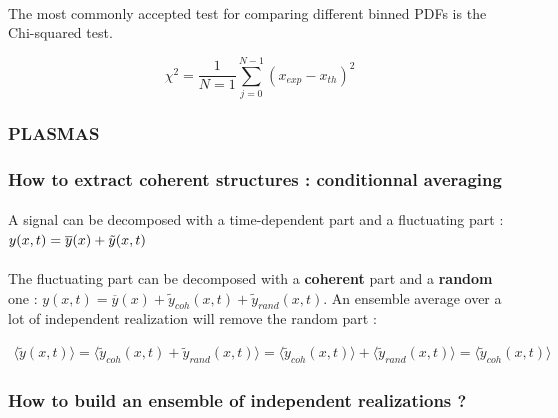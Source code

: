 \paragraph{}
The most commonly accepted test for comparing different binned PDFs is the Chi-squared test. 

\begin{equation}
    \chi^2 = \frac{1}{N=1}\sum_{j=0}^{N-1} (x_{exp} - x_{th})^2
\end{equation}

\subsubsection{PLASMAS}

\subsubsection{How to extract coherent structures : conditionnal averaging}

\paragraph{}
A signal can be decomposed with a time-dependent part and a fluctuating part : \(y(x,t) = \overline{y}(x) + \Tilde{y}(x,t)\)

\paragraph{}
The fluctuating part can be decomposed with a \textbf{coherent} part and a \textbf{random} one : \(y(x,t) = \overline{y} (x) + \tilde{y}_{coh} (x,t) + \tilde{y}_{rand}(x,t)\). An ensemble average over a lot of independent realization will remove the random part :

\begin{gather*}
    \langle \tilde{y}(x,t) \rangle = \langle \tilde{y}_{coh}(x,t) + \tilde{y}_{rand}(x,t) \rangle = \langle \tilde{y}_{coh}(x,t) \rangle + \langle \tilde{y}_{rand}(x,t) \rangle = \langle \tilde{y}_{coh}(x,t) \rangle 
\end{gather*}

\subsubsection{How to build an ensemble of independent realizations ?}

